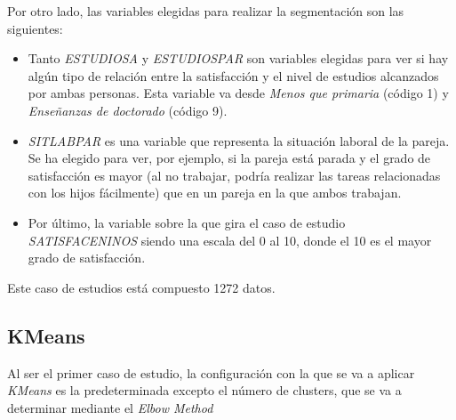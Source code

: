 \documentclass[paper=a4, fontsize=12pt]{article} %
\numberwithin{equation}{section} %
\numberwithin{figure}{section} %
\numberwithin{table}{section} %
\begin{document}
Por otro lado, las variables elegidas para realizar la segmentación son las siguientes:
\begin{itemize}
\item Tanto \textit{ESTUDIOSA} y \textit{ESTUDIOSPAR} son variables elegidas para ver si hay algún tipo de relación entre la satisfacción y el nivel de estudios alcanzados por ambas personas. Esta variable va desde \textit{Menos que primaria} (código 1) y \textit{Enseñanzas de doctorado} (código 9).
\item \textit{SITLABPAR} es una variable que representa la situación laboral de la pareja. Se ha elegido para ver, por ejemplo, si la pareja está parada y el grado de satisfacción es mayor (al no trabajar, podría realizar las tareas relacionadas con los hijos fácilmente) que en un pareja en la que ambos trabajan.
\item Por último, la variable sobre la que gira el caso de estudio \textit{SATISFACENINOS} siendo una escala del 0 al 10, donde el 10 es el mayor grado de satisfacción.
\end{itemize}

Este caso de estudios está compuesto 1272 datos.


\subsection{KMeans}

Al ser el primer caso de estudio, la configuración con la que se va a aplicar \textit{KMeans} es la predeterminada excepto el número de clusters, que se va a determinar mediante  el \textit{Elbow Method}

\begin{figure}[H]
    \centering
    \mbox {
    }
\end{figure}
\end{document}
